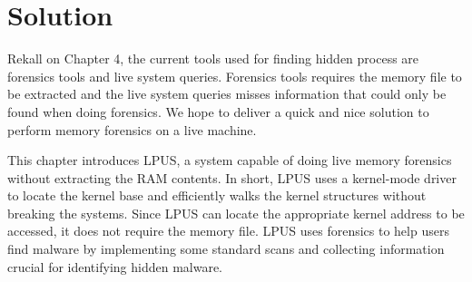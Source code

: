 \chapter[Solution]{Solution}

Rekall on Chapter 4, the current tools used for finding hidden process are
forensics tools and live system queries. Forensics tools requires the memory
file to be extracted and the live system queries misses information that could
only be found when doing forensics. We hope to deliver a quick and nice
solution to perform memory forensics on a live machine.

This chapter introduces LPUS, a system capable of doing live memory forensics
without extracting the RAM contents. In short, LPUS uses a kernel-mode driver
to locate the kernel base and efficiently walks the kernel structures without
breaking the systems. Since LPUS can locate the appropriate kernel address to
be accessed, it does not require the memory file. LPUS uses forensics to help
users find malware by implementing some standard scans and collecting
information crucial for identifying hidden malware.



% 
